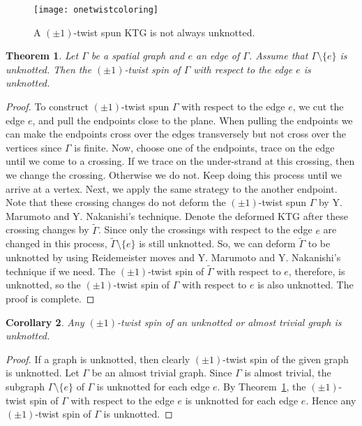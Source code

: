 \documentclass{amsart}
\newtheorem{theorem}{Theorem}[section]
\newtheorem{corollary}[theorem]{Corollary}
\theoremstyle{definition}
\theoremstyle{remark}
\numberwithin{equation}{section}
\begin{document}
\begin{figure}[h]
\texttt{[image: onetwistcoloring]}
\caption{A $(\pm1)$-twist spun KTG is not always unknotted.}
\label{6}
\end{figure}

\begin{theorem}
\label{AT}
Let $\Gamma$ be a spatial graph and $e$ an edge of $\Gamma$. Assume that $\Gamma \setminus \{e\}$ is unknotted. Then the $(\pm1)$-twist spin of $\Gamma$ with respect to the edge $e$ is unknotted.
\end{theorem}

\begin{proof}
To construct $(\pm1)$-twist spun $\Gamma$ with respect to the edge $e$, we cut the edge $e$, and pull the endpoints close to the plane. When pulling the endpoints we can make the endpoints cross over the edges transversely but not cross over the vertices since $\Gamma$ is finite. Now, choose one of the endpoints, trace on the edge until we come to a crossing. If we trace on the under-strand at this crossing, then we change the crossing. Otherwise we do not. Keep doing this process until we arrive at a vertex. Next, we apply the same strategy to the another endpoint. Note that these crossing changes do not deform the $(\pm1)$-twist spun $\Gamma$ by Y. Marumoto and Y. Nakanishi's technique. Denote the deformed KTG after these crossing changes by $\widetilde{\Gamma}$. Since only the crossings with respect to the edge $e$ are changed in this process, $\widetilde{\Gamma} \setminus \{e\}$ is still unknotted. So, we can deform $\widetilde{\Gamma}$ to be unknotted by using Reidemeister moves and Y. Marumoto and Y. Nakanishi's technique if we need. The $(\pm1)$-twist spin of $\widetilde{\Gamma}$ with respect to $e$, therefore, is unknotted, so the $(\pm1)$-twist spin of $\Gamma$ with respect to $e$ is also unknotted. The proof is complete.
\end{proof}

\begin{corollary}
Any $(\pm1)$-twist spin of an unknotted or almost trivial graph is unknotted.
\end{corollary}

\begin{proof}
If a graph is unknotted, then clearly $(\pm1)$-twist spin of the given graph is unknotted. Let $\Gamma$ be an almost trivial graph. Since $\Gamma$ is almost trivial, the subgraph $\Gamma \setminus \{e\}$ of $\Gamma$ is unknotted for each edge $e$. By Theorem~\ref{AT}, the $(\pm1)$-twist spin of $\Gamma$ with respect to the edge $e$ is unknotted for each edge $e$. Hence any $(\pm1)$-twist spin of $\Gamma$ is unknotted.
\end{proof}
\end{document}
